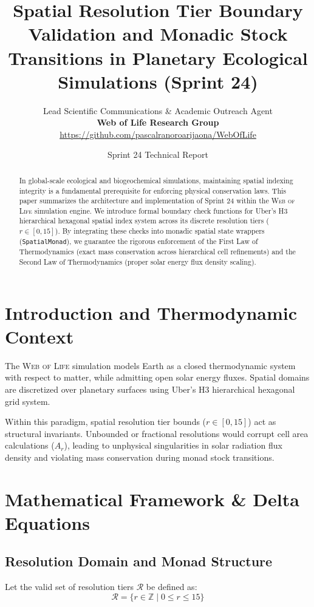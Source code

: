 \documentclass[11pt, a4paper]{article}
\title{\textbf{Spatial Resolution Tier Boundary Validation and Monadic Stock Transitions in Planetary Ecological Simulations (Sprint 24)}}
\author{Lead Scientific Communications \& Academic Outreach Agent \\ \textbf{Web of Life Research Group} \\ \url{https://github.com/pascalranoroarijaona/WebOfLife}}
\date{Sprint 24 Technical Report}
\begin{document}
\maketitle

\begin{abstract}
In global-scale ecological and biogeochemical simulations, maintaining spatial indexing integrity is a fundamental prerequisite for enforcing physical conservation laws. This paper summarizes the architecture and implementation of Sprint 24 within the \textsc{Web of Life} simulation engine. We introduce formal boundary check functions for Uber's H3 hierarchical hexagonal spatial index system across its discrete resolution tiers ($r \in [0, 15]$). By integrating these checks into monadic spatial state wrappers (\texttt{SpatialMonad}), we guarantee the rigorous enforcement of the First Law of Thermodynamics (exact mass conservation across hierarchical cell refinements) and the Second Law of Thermodynamics (proper solar energy flux density scaling).
\end{abstract}

\section{Introduction and Thermodynamic Context}
The \textsc{Web of Life} simulation models Earth as a closed thermodynamic system with respect to matter, while admitting open solar energy fluxes. Spatial domains are discretized over planetary surfaces using Uber's H3 hierarchical hexagonal grid system. 

Within this paradigm, spatial resolution tier bounds ($r \in [0, 15]$) act as structural invariants. Unbounded or fractional resolutions would corrupt cell area calculations ($A_r$), leading to unphysical singularities in solar radiation flux density and violating mass conservation during monad stock transitions.

\section{Mathematical Framework \& Delta Equations}

\subsection{Resolution Domain and Monad Structure}
Let the valid set of resolution tiers $\mathcal{R}$ be defined as:
$$\mathcal{R} = \{r \in \mathbb{Z} \mid 0 \le r \le 15\}$$
\end{document}
